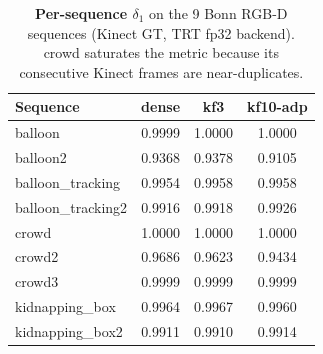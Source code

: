 \begin{table}[t]
\centering\footnotesize
\caption{\textbf{Per-sequence $\delta_1$} on the 9 Bonn RGB-D sequences
(Kinect GT, TRT fp32 backend). crowd saturates the metric because its
consecutive Kinect frames are near-duplicates.}
\label{tab:bonnperseq}
\begin{tabular}{lccc}
\toprule
Sequence & dense & kf3 & kf10-adp\\
\midrule
balloon & 0.9999 & 1.0000 & 1.0000 \\
balloon2 & 0.9368 & 0.9378 & 0.9105 \\
balloon\_tracking & 0.9954 & 0.9958 & 0.9958 \\
balloon\_tracking2 & 0.9916 & 0.9918 & 0.9926 \\
crowd & 1.0000 & 1.0000 & 1.0000 \\
crowd2 & 0.9686 & 0.9623 & 0.9434 \\
crowd3 & 0.9999 & 0.9999 & 0.9999 \\
kidnapping\_box & 0.9964 & 0.9967 & 0.9960 \\
kidnapping\_box2 & 0.9911 & 0.9910 & 0.9914 \\
\bottomrule
\end{tabular}
\end{table}
